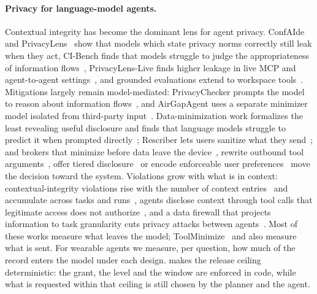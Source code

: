 \paragraph{Privacy for language-model agents.} Contextual integrity has become the dominant lens for agent privacy.
ConfAIde~\citep{mireshghallah2024confaide} and PrivacyLens~\citep{shao2024privacylens} show that models which
state privacy norms correctly still leak when they act, CI-Bench finds that models struggle to judge the
appropriateness of information flows~\citep{cheng2024cibench}, PrivacyLens-Live finds higher leakage in live MCP and agent-to-agent
settings~\citep{wang2025privacyinaction}, and grounded evaluations extend to workspace
tools~\citep{guo2026agentciscope}. Mitigations largely remain model-mediated: PrivacyChecker prompts the model to
reason about information flows~\citep{wang2025privacyinaction}, and AirGapAgent uses a separate minimizer model
isolated from third-party input~\citep{bagdasarian2024airgap}. Data-minimization work formalizes the least revealing
useful disclosure and finds that language models struggle to predict it when prompted
directly~\citep{zhou2025dataminimization}; Rescriber lets users sanitize what they send~\citep{zhou2025rescriber};
and brokers that minimize before data leave the device~\citep{yu2026minim}, rewrite outbound tool
arguments~\citep{li2026toolminimize}, offer tiered disclosure~\citep{maeda2026puda} or encode enforceable user
preferences~\citep{kochar2026preference} move the decision toward the system. Violations grow with what is in context: contextual-integrity violations rise with the number of context
entries~\citep{fu2026ciwork} and accumulate across tasks and runs~\citep{mireshghallah2025cimemories}, agents disclose
context through tool calls that legitimate access does not authorize~\citep{dong2026claw}, and a data firewall that
projects information to task granularity cuts privacy attacks between agents~\citep{abdelnabi2025firewalls}. Most of
these works measure what leaves the model; ToolMinimize~\citep{li2026toolminimize} and
\citet{zhou2025dataminimization} also measure what is sent. For wearable agents we measure, per question, how
much of the record enters the model under each design. \sys{} makes the release ceiling deterministic: the grant,
the level and the window are enforced in code, while what is requested within that ceiling is still chosen by the
planner and the agent.

